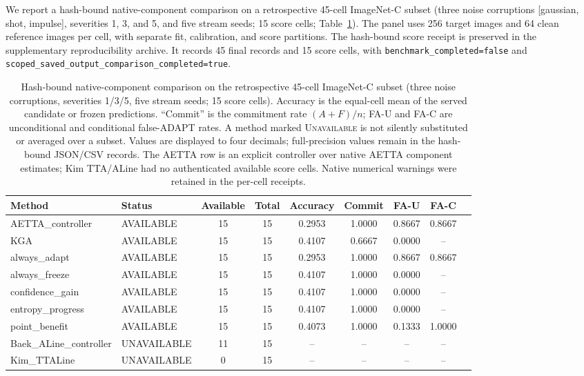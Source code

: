 We report a hash-bound native-component comparison on a retrospective 45-cell ImageNet-C subset
(three noise corruptions [gaussian, shot, impulse], severities 1, 3, and 5, and five stream seeds;
15 score cells; Table~\ref{tab:native-component-45}). The panel uses 256 target images and 64 clean
reference images per cell, with separate fit, calibration, and score partitions. The hash-bound score
receipt is preserved in the supplementary reproducibility archive.
It records 45 final records and 15 score cells, with \texttt{benchmark\_completed=false} and
\texttt{scoped\_saved\_output\_}\allowbreak\texttt{comparison\_completed=true}.

\begin{table}[t]
\centering
\small
\caption{Hash-bound native-component comparison on the retrospective 45-cell ImageNet-C subset (three noise corruptions, severities 1/3/5, five stream seeds; 15 score cells). Accuracy is the equal-cell mean of the served candidate or frozen predictions. ``Commit'' is the commitment rate $(A + F)/n$; FA-U and FA-C are unconditional and conditional false-ADAPT rates. A method marked \textsc{Unavailable} is not silently substituted or averaged over a subset. Values are displayed to four decimals; full-precision values remain in the hash-bound JSON/CSV records. The AETTA row is an explicit controller over native AETTA component estimates; Kim TTA/ALine had no authenticated available score cells. Native numerical warnings were retained in the per-cell receipts.}
\label{tab:native-component-45}
\begin{tabular}{@{}llccccccc@{}}
\toprule
Method & Status & Available & Total & Accuracy & Commit & FA-U & FA-C \\
\midrule
AETTA\_controller       & AVAILABLE   & 15 & 15 & 0.2953 & 1.0000 & 0.8667 & 0.8667 \\
KGA                     & AVAILABLE   & 15 & 15 & 0.4107 & 0.6667 & 0.0000 & --     \\
always\_adapt           & AVAILABLE   & 15 & 15 & 0.2953 & 1.0000 & 0.8667 & 0.8667 \\
always\_freeze          & AVAILABLE   & 15 & 15 & 0.4107 & 1.0000 & 0.0000 & --     \\
confidence\_gain        & AVAILABLE   & 15 & 15 & 0.4107 & 1.0000 & 0.0000 & --     \\
entropy\_progress       & AVAILABLE   & 15 & 15 & 0.4107 & 1.0000 & 0.0000 & --     \\
point\_benefit          & AVAILABLE   & 15 & 15 & 0.4073 & 1.0000 & 0.1333 & 1.0000 \\
Baek\_ALine\_controller & UNAVAILABLE & 11 & 15 & --     & --     & --     & --     \\
Kim\_TTALine            & UNAVAILABLE &  0 & 15 & --     & --     & --     & --     \\
\bottomrule
\end{tabular}
\end{table}

